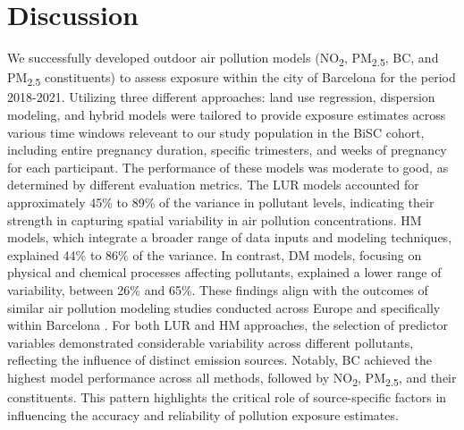 \documentclass{article}
\begin{document}
\newpage

\section{Discussion}

We successfully developed outdoor air pollution models (NO\textsubscript{2}, PM\textsubscript{2.5}, BC, and PM\textsubscript{2.5} constituents) to assess 
exposure within the city of Barcelona for the period 2018-2021. Utilizing three different approaches: land use regression, dispersion modeling, and hybrid models were tailored to provide exposure estimates across various time windows releveant to our study population in the BiSC cohort, including entire pregnancy duration, specific trimesters, and weeks of pregnancy for each participant. The performance of these models was moderate to good, as determined by different evaluation metrics. The LUR models accounted for approximately 45\% to 89\% of the variance in pollutant levels, indicating their strength in capturing spatial variability in air pollution concentrations. HM models, which integrate a broader range of data inputs and modeling techniques, explained 44\% to 86\% of the variance. In contrast, DM models, focusing on physical and chemical processes affecting pollutants, explained a lower range of variability, between 26\% and 65\%. These findings align with the outcomes of similar air pollution modeling studies conducted across Europe and specifically within Barcelona \cite{fung2024, mila2023, criado2023, rovira2022, chen2020, dehoogh2018, dehoogh2013}. For both LUR and HM approaches, the selection of predictor variables demonstrated considerable variability across different pollutants, reflecting the influence of distinct emission sources. Notably, BC achieved the highest model performance across all methods, followed by NO\textsubscript{2}, PM\textsubscript{2.5}, and their constituents. This pattern highlights the critical role of source-specific factors in influencing the accuracy and reliability of pollution exposure estimates.\\
\end{document}
